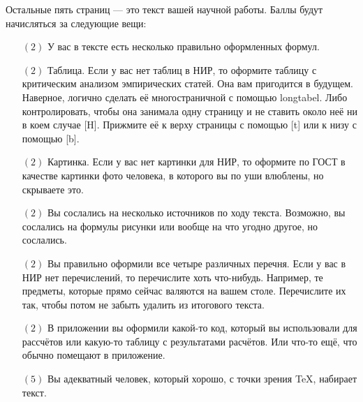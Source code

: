 \documentclass[12pt, a4paper, oneside]{article}
\begin{document}
Остальные пять страниц — это текст вашей научной работы. Баллы будут начисляться за следующие вещи:

\begin{itemize}
\item[$(2)$]  У вас в тексте есть несколько правильно оформленных формул.

\item[$(2)$]  Таблица. Если у вас нет таблиц в НИР, то оформите таблицу с критическим анализом эмпирических статей. Она вам пригодится в будущем. Наверное, логично сделать её многостраничной с помощью longtabel. Либо контролировать, чтобы она занимала одну страницу и не ставить около неё ни в коем случае [H]. Прижмите её к верху страницы с помощью [t] или к низу с помощью [b].

\item[$(2)$]  Картинка. Если у вас нет картинки для НИР, то оформите по ГОСТ в качестве картинки фото человека, в которого вы по уши влюблены, но скрываете это.

\item[$(2)$]  Вы сослались на несколько источников по ходу текста. Возможно, вы сослались на формулы рисунки или вообще на что угодно другое, но сослались.

\item[$(2)$]  Вы правильно оформили все четыре различных перечня. Если у вас в НИР нет перечислений, то перечислите хоть что-нибудь. Например, те предметы, которые прямо сейчас валяются на вашем столе. Перечислите их так, чтобы потом не забыть удалить из итогового текста.

\item[$(2)$]  В приложении вы оформили какой-то код, который вы использовали для рассчётов или какую-то таблицу с результатами расчётов. Или что-то ещё, что обычно помещают в приложение.

\item[$(5)$]  Вы адекватный человек, который хорошо, с точки зрения TeX, набирает текст.
\end{itemize} 



\end{document}
